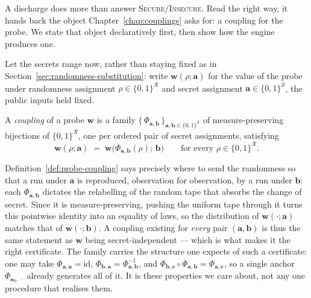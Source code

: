   A discharge does more than answer \textsc{Secure}/\textsc{Insecure}. Read the
  right way, it hands back the object Chapter~\ref{chap:couplings} asks for: a
  coupling for the probe. We state that object declaratively first, then show how
  the engine produces one.

  Let the secrets range now, rather than staying fixed as in
  Section~\ref{sec:randomness-substitution}: write
  $\mathbf{w}(\rho; \mathbf{a})$ for the value of the probe under randomness
  assignment $\rho \in \{0,1\}^{\mathcal{R}}$ and secret assignment
  $\mathbf{a} \in \{0,1\}^{\mathcal{S}}$, the public inputs held fixed.

  \begin{definition}
  \label{def:probe-coupling}
  A \emph{coupling} of a probe $\mathbf{w}$ is a family
  $\{\,\Phi_{\mathbf{a},\mathbf{b}}\,\}_{\mathbf{a},\mathbf{b} \in \{0,1\}^{\mathcal{S}}}$
  of measure-preserving bijections of $\{0,1\}^{\mathcal{R}}$, one per ordered
  pair of secret assignments, satisfying
  \[
    \mathbf{w}(\rho; \mathbf{a}) \;=\; \mathbf{w}\big(\Phi_{\mathbf{a},\mathbf{b}}(\rho);\, \mathbf{b}\big)
    \qquad \text{for every } \rho \in \{0,1\}^{\mathcal{R}} .
  \]
  \end{definition}

  Definition~\ref{def:probe-coupling} says precisely where to send the randomness
  so that a run under $\mathbf{a}$ is reproduced, observation for observation, by
  a run under $\mathbf{b}$: each $\Phi_{\mathbf{a},\mathbf{b}}$ dictates the
  relabelling of the random tape that absorbs the change of secret. Since it is
  measure-preserving, pushing the uniform tape through it turns this pointwise
  identity into an equality of laws, so the distribution of
  $\mathbf{w}(\cdot;\mathbf{a})$ matches that of $\mathbf{w}(\cdot;\mathbf{b})$. A
  coupling existing for \emph{every} pair $(\mathbf{a},\mathbf{b})$ is thus the
  same statement as $\mathbf{w}$ being secret-independent --- which is what makes
  it the right certificate. The family carries the structure one expects of such
  a certificate: one may take $\Phi_{\mathbf{a},\mathbf{a}} = \mathrm{id}$,
  $\Phi_{\mathbf{b},\mathbf{a}} = \Phi_{\mathbf{a},\mathbf{b}}^{-1}$, and
  $\Phi_{\mathbf{b},\mathbf{c}} \circ \Phi_{\mathbf{a},\mathbf{b}} =
  \Phi_{\mathbf{a},\mathbf{c}}$, so a single anchor
  $\Phi_{\mathbf{a}_0,\,\cdot}$ already generates all of it. It is these
  properties we care about, not any one procedure that realises them.

